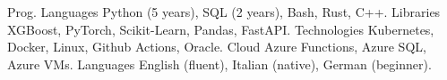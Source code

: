 
\begin{cvskills}
  \cvskill
    {Prog. Languages}
    {Python (5 years), SQL (2 years), Bash, Rust, C++.}
  \cvskill
    {Libraries}
    {XGBoost, PyTorch, Scikit-Learn, Pandas, FastAPI.}
  \cvskill
    {Technologies}
    {Kubernetes, Docker, Linux, Github Actions, Oracle.}
  \cvskill
    {Cloud}
    {Azure Functions, Azure SQL, Azure VMs.}
  \cvskill
    {Languages}
    {English (fluent), Italian (native), German (beginner).}
\end{cvskills}

